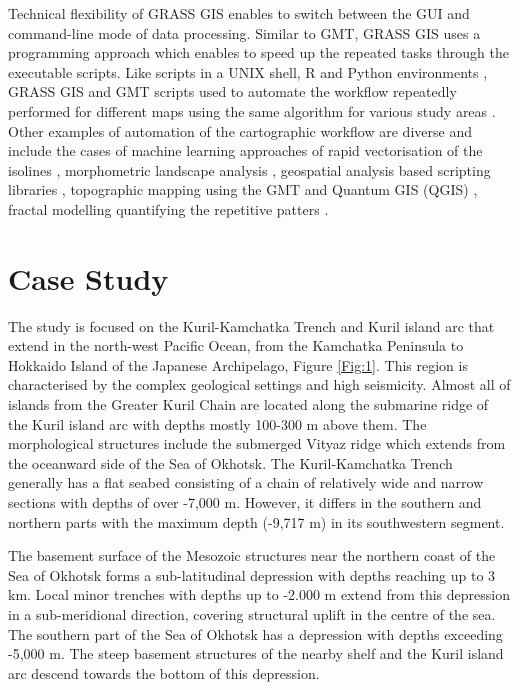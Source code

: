 \documentclass[technologies,article,submit,pdftex,moreauthors]{Definitions/mdpi}
\begin{document}
Technical flexibility of GRASS GIS enables to switch between the GUI and command-line mode of data processing. Similar to GMT, GRASS GIS uses a programming approach which enables to speed up the repeated tasks through the executable scripts. Like scripts in a UNIX shell, R and Python environments \cite{jimaging8120317}, GRASS GIS and GMT scripts \cite{Lemenkova2021g} used to automate the workflow repeatedly performed for different maps using the same algorithm for various study areas \cite{Lemenkova2022b}. Other examples of automation of the cartographic workflow are diverse and include the cases of machine learning approaches of rapid vectorisation of the isolines \cite{Lemenkova2020e}, morphometric landscape analysis \cite{Clarke,Sofia}, geospatial analysis based scripting libraries \cite{su142315966}, topographic mapping using the GMT and Quantum GIS (QGIS) \cite{Lemenkova2022a,LemenkovaDebeir2022JAES,Lemenkova2020c}, fractal modelling quantifying the repetitive patters \cite{Malinverno}.

\section{Case Study}

The study is focused on the Kuril-Kamchatka Trench and Kuril island arc that extend in the north-west Pacific Ocean, from the Kamchatka Peninsula to Hokkaido Island of the Japanese Archipelago, Figure \ref{Fig:1}. This region is characterised by the complex geological settings and high seismicity. Almost all of islands from the Greater Kuril Chain are located along the submarine ridge of the Kuril island arc with depths mostly 100-300 m above them. The morphological structures include the submerged Vityaz ridge which extends from the oceanward side of the Sea of Okhotsk. The Kuril-Kamchatka Trench generally has a flat seabed consisting of a chain of relatively wide and narrow sections with depths of over -7,000 m. However, it differs in the southern and northern parts with the maximum depth (-9,717 m) in its southwestern segment. 

The basement surface of the Mesozoic structures near the northern coast of the Sea of Okhotsk forms a sub-latitudinal depression with depths reaching up to 3 km. Local minor trenches with depths up to -2.000 m extend from this depression in a sub-meridional direction, covering structural uplift in the centre of the sea. The southern part of the Sea of Okhotsk has a depression with depths exceeding -5,000 m. The steep basement structures of the nearby shelf and the Kuril island arc descend towards the bottom of this depression. 
\end{document}
